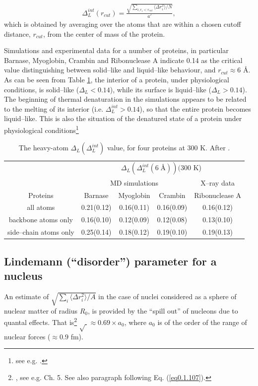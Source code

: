 \begin{subappendices}
\begin{align}
\Delta^{int}_L(r_{cut})=\frac{\sqrt{\sum_{i,r_i<r_{cut}}\langle \Delta r_i^2\rangle/N}}{a'},
\end{align}  
which is obtained by averaging over the atoms that are within a chosen cutoff distance, $r_{cut}$, from the center of mass of the protein.

Simulations and experimental data for a number of proteins, in particular Barnase, Myoglobin, Crambin and Ribonuclease A indicate 0.14 as the critical value distinguishing between solid--like and liquid--like behaviour, and $r_{cut}\approx 6$ \AA. As can be seen from Table \ref{tab2C1}, the interior of a protein, under physiological conditions, is solid--like  ($\Delta_L<0.14$), while its surface is liquid--like ($\Delta_L>0.14$). The beginning of thermal denaturation in the simulations appears to be related to the melting of its interior (i.e. $\Delta^{int}_L>0.14$), so that the entire protein becomes liquid--like. This is also the situation of the denatured state of a protein under physiological conditions\footnote{see e.g. \cite{Rosner:17}.} 



\begin{table}[h]
 \begin{tabular}{|c|c|c|c|c|}
 \hline
 &\multicolumn{4}{|c|}{$\Delta_L(\Delta_L^{int}(6\;\text{\AA}))(300$ K)}\\
 \cline{2-5}
 &\multicolumn{3}{|c|}{MD simulations}&X--ray data\\
 \hline
 Proteins&Barnase&Myoglobin&Crambin&Ribonuclease A\\
 \hline
 all atoms&0.21(0.12)&0.16(0.11)&0.16(0.09)&0.16(0.12)\\
 backbone atoms only&0.16(0.10)&0.12(0.09)&0.12(0.08)&0.13(0.10)\\
 side--chain atoms only&0.25(0.14)&0.18(0.12)&0.19(0.10)&0.19(0.13)\\
 \hline
 \end{tabular}
 \caption{The heavy-atom $\Delta_L(\Delta_L^{int})$ value, for four proteins at 300 K. After \cite{Zhou:99}.}\label{tab2C1}
 \end{table}

\subsection{Lindemann (``disorder'') parameter for a nucleus}
An estimate of  $\sqrt{\sum_i\langle \Delta r_i^2\rangle/A}$ in the case of nuclei considered as a sphere of nuclear matter of radius $R_0$, is provided by the ``spill out'' of nucleons due to quantal effects. That is\footnote{\cite{Bertsch:05}, see e.g. Ch. 5. See also paragraph following Eq. (\ref{eq0.1.107}).} $\sqrt{\;}\approx 0.69\times a_0$, where $a_0$ is of the order of the range of nuclear forces ($\approx 0.9$ fm).



\end{subappendices}

